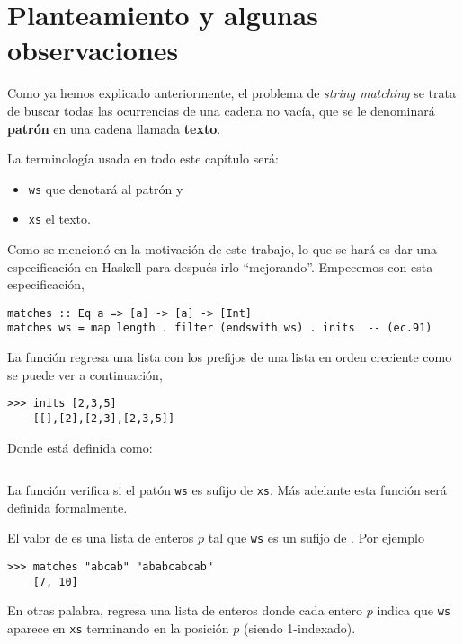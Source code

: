 \section{Planteamiento y algunas observaciones}

Como ya hemos explicado anteriormente, el problema de \textit{string matching} se trata de buscar
todas las ocurrencias de una cadena no vacía, que se le denominará \textbf{patrón} en una cadena
llamada \textbf{texto}. 

La terminología usada en todo este capítulo será:
\begin{itemize}
    \item \texttt{ws} que denotará al patrón y
    \item \texttt{xs} el texto.
\end{itemize}

Como se mencionó en la motivación de este trabajo, lo que se hará es dar una especificación en
Haskell para después irlo ``mejorando''. Empecemos con esta especificación,

\begin{verbatim}
matches :: Eq a => [a] -> [a] -> [Int]
matches ws = map length . filter (endswith ws) . inits  -- (ec.91)
\end{verbatim}


La función  regresa una lista con los prefijos de una lista en orden creciente como se 
puede ver a continuación,

\begin{verbatim}
>>> inits [2,3,5]
    [[],[2],[2,3],[2,3,5]]
\end{verbatim}

Donde  está definida como:

\inputminted{haskell}{definiciones/inits.hs}

La función  verifica si el patón \texttt{ws} es sufijo de \texttt{xs}. Más adelante esta función será definida formalmente.

El valor de  es una lista de enteros $p$ tal que \texttt{ws} es un sufijo de . Por ejemplo

\begin{verbatim}
>>> matches "abcab" "ababcabcab" 
    [7, 10]
\end{verbatim}

En otras palabra,  regresa una lista de enteros donde cada entero $p$ indica que
\texttt{ws} aparece en \texttt{xs} terminando en la posición $p$ (siendo 1-indexado).

